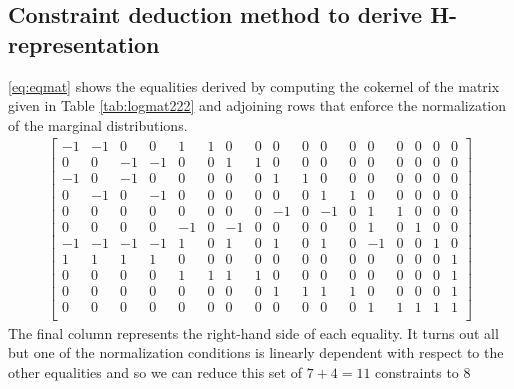 \subsection*{Constraint deduction method to derive H-representation}
\ref{eq:eqmat} shows the equalities derived by computing the cokernel of the matrix given in Table \ref{tab:logmat222} and adjoining rows that enforce the normalization of the marginal distributions.
\begin{equation}\label{eq:eqmat}
\begin{aligned}
\begin{bmatrix}
  -1 & -1 & 0 & 0 & 1 & 1 & 0 & 0 & 0 & 0 & 0 & 0 & 0 & 0 & 0 & 0 & 0\\
  0 & 0 & -1 & -1 & 0 & 0 & 1 & 1 & 0 & 0 & 0 & 0 & 0 & 0 & 0 & 0 & 0\\
  -1 & 0 & -1 & 0 & 0 & 0 & 0 & 0 & 1 & 1 & 0 & 0 & 0 & 0 & 0 & 0 & 0\\
  0 & -1 & 0 & -1 & 0 & 0 & 0 & 0 & 0 & 0 & 1 & 1 & 0 & 0 & 0 & 0 & 0\\
  0 & 0 & 0 & 0 & 0 & 0 & 0 & 0 & -1 & 0 & -1 & 0 & 1 & 1 & 0 & 0 & 0\\
  0 & 0 & 0 & 0 & -1 & 0 & -1 & 0 & 0 & 0 & 0 & 0 & 1 & 0 & 1 & 0 & 0\\
  -1 & -1 & -1 & -1 & 1 & 0 & 1 & 0 & 1 & 0 & 1 & 0 & -1 & 0 & 0 & 1 & 0\\
  1 & 1 & 1 & 1 & 0 & 0 & 0 & 0 & 0 & 0 & 0 & 0 & 0 & 0 & 0 & 0 & 1\\
  0 & 0 & 0 & 0 & 1 & 1 & 1 & 1 & 0 & 0 & 0 & 0 & 0 & 0 & 0 & 0 & 1\\
  0 & 0 & 0 & 0 & 0 & 0 & 0 & 0 & 1 & 1 & 1 & 1 & 0 & 0 & 0 & 0 & 1\\
  0 & 0 & 0 & 0 & 0 & 0 & 0 & 0 & 0 & 0 & 0 & 0 & 1 & 1 & 1 & 1 & 1\\
\end{bmatrix}
\end{aligned}
\end{equation}
The final column represents the right-hand side of each equality. It turns out all but one of the normalization conditions is linearly dependent with respect to the other equalities and so we can reduce this set of $7+4=11$ constraints to $8$

